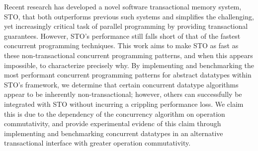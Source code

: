 Recent research has developed a novel software transactional memory system, STO, that both outperforms previous such systems and simplifies the challenging, yet increasingly critical task of parallel programming by providing transactional guarantees. However, STO's performance still falls short of that of the fastest concurrent programming techniques. This work aims to make STO as fast as these non-transactional concurrent programming patterns, and when this appears impossible, to characterize precisely why. By implementing and benchmarking the most performant concurrent programming patterns for abstract datatypes within STO's framework, we determine that certain concurrent datatype algorithms appear to be inherently non-transactional; however, others can successfully be integrated with STO without incurring a crippling performance loss. We claim this is due to the dependency of the concurrency algorithm on operation commutativity, and provide experimental evidenc of this claim through implementing and benchmarking concurrent datatypes in an alternative transactional interface with greater operation commutativity.
